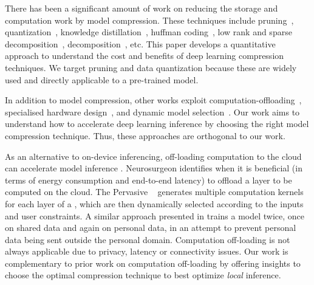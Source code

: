 There has been a significant amount of work on reducing the storage and computation work by model compression. These techniques include
pruning~\cite{Li2016Pruning}, quantization~\cite{Gong2014Compressing,han2015deep}, knowledge
distillation~\cite{hinton2015distilling,Sau2016Deep}, huffman coding~\cite{han2015deep}, low rank and sparse decomposition~\cite{denton2014exploiting}, decomposition~\cite{lebedev2014speeding}, etc. This paper develops a quantitative approach to
understand the cost and benefits of deep learning compression techniques. We target pruning and data quantization because these are widely
used and directly applicable to a pre-trained model.



In addition to model compression, other works exploit computation-offloading~\cite{teerapittayanon2017distributed,Kang2017neurosurgeon},
specialised hardware design~\cite{chen2017eyeriss,Han:2016:EEI:3001136.3001163}, and dynamic model
selection~\cite{Taylor:2018:ADL:3211332.3211336}. Our work aims to understand how to accelerate deep learning inference by choosing the
right model compression technique. Thus, these approaches are orthogonal to our work.


As an alternative to on-device inferencing, off-loading computation to the cloud can accelerate \DNN model inference
\cite{teerapittayanon2017distributed}. Neurosurgeon \cite{Kang2017neurosurgeon} identifies when it is beneficial (\eg in terms of energy
consumption and end-to-end latency) to offload a \DNN layer to be computed on the cloud. The Pervasive \CNN~\cite{song2017towards}
generates multiple computation kernels for each layer of a \CNN, which are then dynamically selected according to the inputs and user
constraints. A similar approach presented in \cite{servia2017personal} trains a model twice, once on shared data and again on personal
data, in an attempt to prevent personal data being sent outside the personal domain. Computation off-loading is not always applicable due
to privacy, latency or connectivity issues. Our work is complementary to prior work on computation off-loading by offering insights to
choose the optimal compression technique to best optimize \emph{local} inference.



